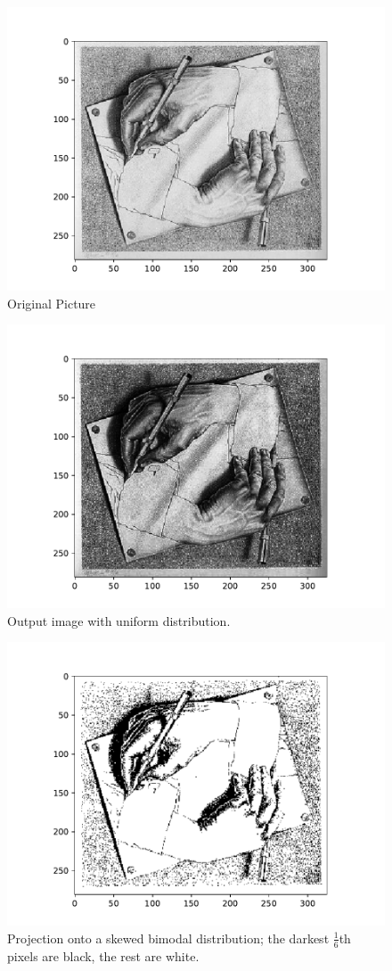 \documentclass[psamsfonts]{amsart}
\theoremstyle{definition}
\theoremstyle{remark}
\numberwithin{equation}{section}
\begin{document}
\begin{figure}
\centering
\includegraphics[width=\textwidth]{original.pdf}
\caption{Original Picture}
\label{fig3}
\end{figure}

\begin{figure}
\centering
\includegraphics[width=\textwidth]{rescaled.pdf}
\caption{Output image with uniform distribution.}
\label{fig4}
\end{figure}

\begin{figure}
\centering
\includegraphics[width=\textwidth]{bimodal.pdf}
\caption{Projection onto a skewed bimodal distribution; 
the darkest $\frac{1}{6}$th pixels are black, the rest are white.}
\label{fig4}
\end{figure}
\end{document}
